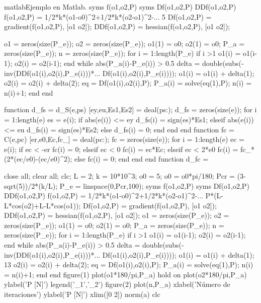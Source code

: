 \begin{sourcecode}{matlab}{Ejemplo en Matlab.}
syms f(o1,o2,P)
syms Df(o1,o2,P) DDf(o1,o2,P)
f(o1,o2,P) = 1/2*k*(o1-o0)^2+1/2*k*(o2-o1)^2-...
5
Df(o1,o2,P) = gradient(f(o1,o2,P), [o1 o2]);
DDf(o1,o2,P) = hessian(f(o1,o2,P), [o1 o2]);

o1 = zeros(size(P_e)); %
o2 = zeros(size(P_e)); %
o1(1) = o0;
o2(1) = o0;
P_a = zeros(size(P_e)); %
n = zeros(size(P_e)); %
for i = 1:length(P_e)
if i >1
o1(i) = o1(i-1);
o2(i) = o2(i-1);
end
while abs(P_a(i)-P_e(i)) > 0.5
delta = double(subs(-inv(DDf(o1(i),o2(i),P_e(i)))*...
Df(o1(i),o2(i),P_e(i))));
o1(i) = o1(i) + delta(1);
o2(i) = o2(i) + delta(2);
eq = Df(o1(i),o2(i),P);
P_a(i) = solve(eq(1),P);
n(i) = n(i)+1;
end
end

function d_fs = d_S(e,ps)
[ey,eu,Es1,Es2] = deal(ps{:});
d_fs = zeros(size(e));
for i = 1:length(e)
es = e(i);
if abs(e(i)) <= ey
d_fs(i) = sign(es)*Es1;
elseif abs(e(i)) <= eu
d_fs(i) = sign(es)*Es2;
else
d_fs(i) = 0;
end
end
end
function fc = C(e,pc)
[er,e0,Ec,fc_] = deal(pc{:});
fc = zeros(size(e));
for i = 1:length(e)
ec = e(i);
if ec < -er
fc(i) = 0;
elseif ec < 0
fc(i) = ec*Ec;
elseif ec < 2*e0
fc(i) = fc_*(2*(ec/e0)-(ec/e0)^2);
else
fc(i) = 0;
end
end
end
function d_fc =

close all; clear all; clc;
L = 2; %
k = 10*10^3; %
o0 = 5; %
o0 = o0*pi/180; %
Pcr = (3-sqrt(5))/2*(k/L); %
P_e = linspace(0,Pcr,100); %
syms f(o1,o2,P)
syms Df(o1,o2,P) DDf(o1,o2,P)
f(o1,o2,P) = 1/2*k*(o1-o0)^2+1/2*k*(o2-o1)^2-...
P*(L-L*cos(o2)+L-L*cos(o1));
Df(o1,o2,P) = gradient(f(o1,o2,P), [o1 o2]);
DDf(o1,o2,P) = hessian(f(o1,o2,P), [o1 o2]);
o1 = zeros(size(P_e)); %
o2 = zeros(size(P_e)); %
o1(1) = o0;
o2(1) = o0;
P_a = zeros(size(P_e)); %
n = zeros(size(P_e)); %
for i = 1:length(P_e)
if i >1
o1(i) = o1(i-1);
o2(i) = o2(i-1);
end
while abs(P_a(i)-P_e(i)) > 0.5
delta = double(subs(-inv(DDf(o1(i),o2(i),P_e(i)))*...
Df(o1(i),o2(i),P_e(i))));
o1(i) = o1(i) + delta(1);
13
o2(i) = o2(i) + delta(2);
eq = Df(o1(i),o2(i),P);
P_a(i) = solve(eq(1),P);
n(i) = n(i)+1;
end
end
figure(1)
plot(o1*180/pi,P_a)
hold on
plot(o2*180/pi,P_a)
ylabel('P [N]')
legend('\theta_1','\theta_2')
figure(2)
plot(n,P_a)
xlabel('Número de iteraciones')
ylabel('P [N]')
xlim([0 2])
norm(a)
clc
\end{sourcecode}